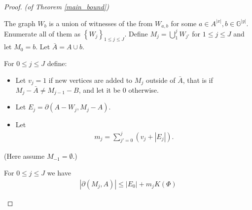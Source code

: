 \documentclass{amsart}
\newcommand{\GG}{\mathbb G}
\newcommand{\GGY}{\GG^{|y|}}
\newcommand{\AX}{A^{|x|}}
\newcommand{\BA}{\bar A}
\newcommand{\E}{\mathscr E}
\newcommand{\B}{B}
\newcommand{\curly}[1]{\left\{#1\right\}}
\begin{document}
\begin{proof} \textit{(of Theorem \ref{main_bound})}

  The graph $W_b$ is a union of witnesses of the from $W_{a,b}$ for some $a \in \AX, b \in \GGY$.
  Enumerate all of them as $\curly{W_j}_{1 \leq j \leq J}$.
  Define $M_j = \bigcup_1^j W_{j'}$ for $1 \leq j \leq J$ and let $M_0 = b$.
  Let $\BA = A \cup b$.
  \begin{Definition}
    For $0 \leq j \leq J$ define:
    \begin{itemize}
    \item Let $v_j = 1$ if new vertices are added to $M_j$ outside of $\BA$, that is if
      $M_j - \BA \neq M_{j-1} - \B$,
      and let it be $0$ otherwise.
    \item Let %
      $E_j = \partial(A - W_j, M_j - A)$.
    \item Let
      \begin{align*}
        m_j = \sum_{j' = 0}^j (v_j + |E_j|).
      \end{align*}
    \end{itemize}
    (Here assume $M_{-1} = \emptyset$.)
  \end{Definition}

  \begin{Lemma} \label{ubd_lemma}
    For $0 \leq j \leq J$ we have
    \begin{align*}
      |\partial(M_j, A)| \leq |E_0| + m_j K(\Phi) 
    \end{align*}
  \end{Lemma}


\end{proof}
\end{document}
